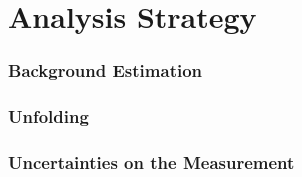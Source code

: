 \part{Analysis Strategy}
\label{sec:Analysis Strategy}

\section{Background Estimation}
\label{sec:Bkg}


\section{Unfolding}
\label{sec:Unfolding}


\section{Uncertainties on the Measurement}
\label{sec:Uncertainties}


